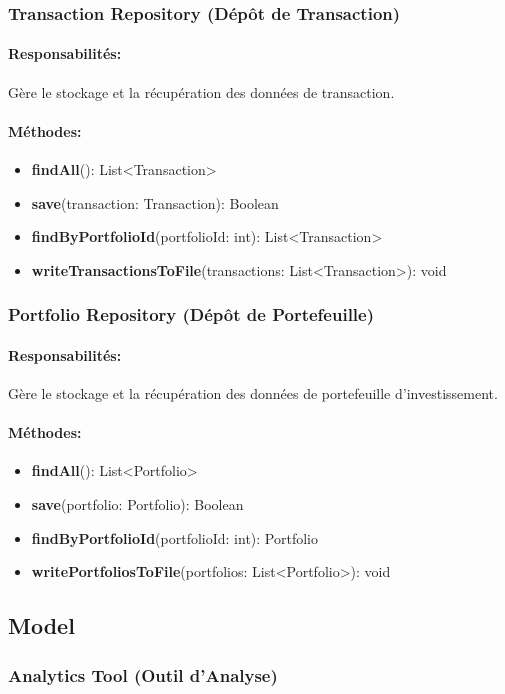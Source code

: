 \documentclass{article}
\begin{document}
\subsubsection{Transaction Repository (Dépôt de Transaction)}
\paragraph{Responsabilités:} Gère le stockage et la récupération des données de transaction.
\paragraph{Méthodes:}
\begin{itemize}
  \item \textbf{findAll}(): List<Transaction>
  \item \textbf{save}(transaction: Transaction): Boolean
  \item \textbf{findByPortfolioId}(portfolioId: int): List<Transaction>
  \item \textbf{writeTransactionsToFile}(transactions: List<Transaction>): void
\end{itemize}
\subsubsection{Portfolio Repository (Dépôt de Portefeuille)}
\paragraph{Responsabilités:} Gère le stockage et la récupération des données de portefeuille d'investissement.
\paragraph{Méthodes:}
\begin{itemize}
  \item \textbf{findAll}(): List<Portfolio>
  \item \textbf{save}(portfolio: Portfolio): Boolean
  \item \textbf{findByPortfolioId}(portfolioId: int): Portfolio
  \item \textbf{writePortfoliosToFile}(portfolios: List<Portfolio>): void
\end{itemize}
\subsection{Model}
\subsubsection{Analytics Tool (Outil d'Analyse)}
\end{document}
